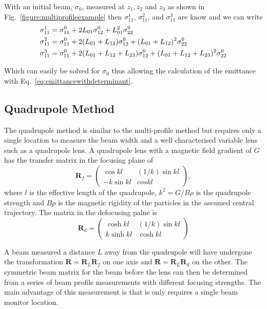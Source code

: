 With an initial beam, $\sigma_0$, measured at $z_1, z_2$ and $z_3$ as shown in Fig.~\ref{figure:multiprofileexample} then $\sigma_{11}^1$, $\sigma_{11}^2$, and $\sigma_{11}^3$ are know and we can write 
\begin{align}
\sigma_{11}^1 &= \sigma_{11}^0 +2L_{01}\sigma_{12}^0 + L_{01}^2\sigma_{22}^0 \notag\\
\sigma_{11}^2&= \sigma_{11}^0+2(L_{01}+L_{12})\sigma_{12}^0 + (L_{01}+L_{12})^2\sigma_{22}^0 \notag\\
\sigma_{11}^3&= \sigma_{11}^0+2(L_{01}+L_{12}+L_{23})\sigma_{12}^0 + (L_{01}+L_{12}+L_{23})^2\sigma_{22}^0 \label{eq:multiprofilesolution}
\end{align}

Which can easily be solved for $\sigma_0$ thus allowing the calculation of the emittance with Eq.~\ref{eq:emittancewithdeterminant}.

\subsection{Quadrupole Method}

The quadrupole method is similar to the multi-profile method but requires only a single location to measure the beam width and a well characterised variable lens such as a quadrupole lens.
A quadrupole lens with a magnetic field gradient of $G$ has the transfer matrix in the focusing plane of
\begin{equation}
\mathbf{R}_f = \begin{pmatrix} \cos kl & (1/k)\sin kl\\
-k\sin kl & cos kl\end{pmatrix},
\end{equation}
where $l$ is the effective length of the quadrupole, $k^2=G/B\rho$ is the quadrupole strength and $B\rho$ is the magnetic rigidity of the particles in the assumed central trajectory.
The matrix in the defocusing palne is
\begin{equation}
\mathbf{R}_d = \begin{pmatrix} \cosh kl & (1/k) \sin kl\\
k \sinh kl & \cosh kl \end{pmatrix}
\end{equation}

A beam measured a distance $L$ away from the quadrupole will have undergone the transformation $\mathbf{R}=\mathbf{R}_L\mathbf{R}_f$ on one axis and $\mathbf{R}=\mathbf{R}_L\mathbf{R}_d$ on the other.
The symmetric beam matrix for the beam before the lens can then be determined from a series of beam profile measurements with different focusing strengths.
The main advantage of this measurement is that is only requires a single beam monitor location.

